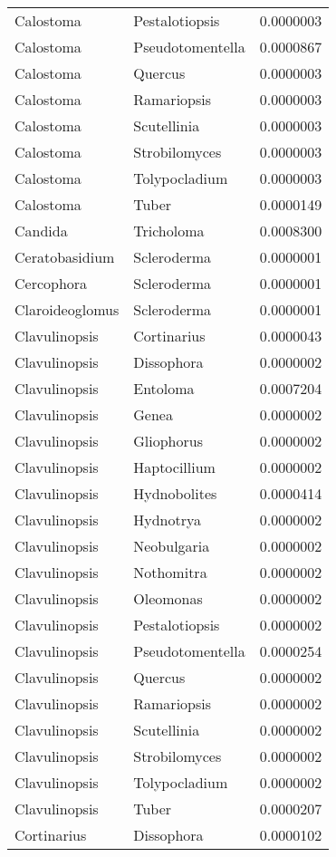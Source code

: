 \documentclass[border=1mm]{standalone}
\begin{document}
\begin{longtable}[t]{lll}
Calostoma & Pestalotiopsis & 0.0000003\\
Calostoma & Pseudotomentella & 0.0000867\\
Calostoma & Quercus & 0.0000003\\
Calostoma & Ramariopsis & 0.0000003\\
\addlinespace
Calostoma & Scutellinia & 0.0000003\\
Calostoma & Strobilomyces & 0.0000003\\
Calostoma & Tolypocladium & 0.0000003\\
Calostoma & Tuber & 0.0000149\\
Candida & Tricholoma & 0.0008300\\
\addlinespace
Ceratobasidium & Scleroderma & 0.0000001\\
Cercophora & Scleroderma & 0.0000001\\
Claroideoglomus & Scleroderma & 0.0000001\\
Clavulinopsis & Cortinarius & 0.0000043\\
Clavulinopsis & Dissophora & 0.0000002\\
\addlinespace
Clavulinopsis & Entoloma & 0.0007204\\
Clavulinopsis & Genea & 0.0000002\\
Clavulinopsis & Gliophorus & 0.0000002\\
Clavulinopsis & Haptocillium & 0.0000002\\
Clavulinopsis & Hydnobolites & 0.0000414\\
\addlinespace
Clavulinopsis & Hydnotrya & 0.0000002\\
Clavulinopsis & Neobulgaria & 0.0000002\\
Clavulinopsis & Nothomitra & 0.0000002\\
Clavulinopsis & Oleomonas & 0.0000002\\
Clavulinopsis & Pestalotiopsis & 0.0000002\\
\addlinespace
Clavulinopsis & Pseudotomentella & 0.0000254\\
Clavulinopsis & Quercus & 0.0000002\\
Clavulinopsis & Ramariopsis & 0.0000002\\
Clavulinopsis & Scutellinia & 0.0000002\\
Clavulinopsis & Strobilomyces & 0.0000002\\
\addlinespace
Clavulinopsis & Tolypocladium & 0.0000002\\
Clavulinopsis & Tuber & 0.0000207\\
Cortinarius & Dissophora & 0.0000102\\

\end{longtable}
\end{document}
